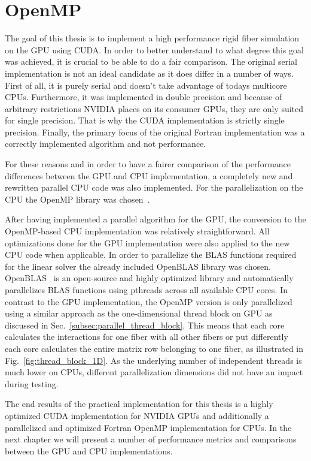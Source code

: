 \section{OpenMP}

The goal of this thesis is to implement a high performance rigid fiber simulation on the GPU using CUDA. In order to better understand to what degree this goal was achieved, it is crucial to be able to do a fair comparison. The original serial implementation is not an ideal candidate as it does differ in a number of ways. First of all, it is purely serial and doesn't take advantage of todays multicore CPUs. Furthermore, it was implemented in double precision and because of arbitrary restrictions NVIDIA places on its consumer GPUs, they are only suited for single precision. That is why the CUDA implementation is strictly single precision. Finally, the primary focus of the original Fortran implementation was a correctly implemented algorithm and not performance.

For these reasons and in order to have a fairer comparison of the performance differences between the GPU and CPU implementation, a completely new and rewritten parallel CPU code was also implemented. For the parallelization on the CPU the OpenMP library was chosen~\cite{OpenMP}.

After having implemented a parallel algorithm for the GPU, the conversion to the OpenMP-based CPU implementation was relatively straightforward. All optimizations done for the GPU implementation were also applied to the new CPU code when applicable. In order to parallelize the BLAS functions required for the linear solver the already included OpenBLAS library was chosen. OpenBLAS~\cite{OpenBLAS} is an open-source and highly optimized library and automatically parallelizes BLAS functions using pthreads across all available CPU cores. In contrast to the GPU implementation, the OpenMP version is only parallelized using a similar approach as the one-dimensional thread block on GPU as discussed in Sec.~\ref{subsec:parallel_thread_block}. This means that each core calculates the interactions for one fiber with all other fibers or put differently each core calculates the entire matrix row belonging to one fiber, as illustrated in Fig.~\ref{fig:thread_block_1D}. As the underlying number of independent threads is much lower on CPUs, different parallelization dimensions did not have an impact during testing.

The end results of the practical implementation for this thesis is a highly optimized CUDA implementation for NVIDIA GPUs and additionally a parallelized and optimized Fortran OpenMP implementation for CPUs. In the next chapter we will present a number of performance metrics and comparisons between the GPU and CPU implementations.

